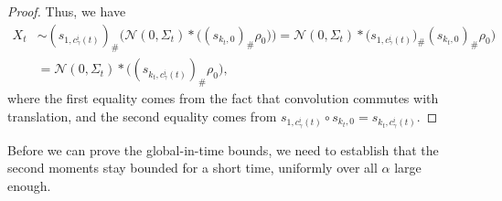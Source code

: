 \documentclass[reqno]{amsart}
\numberwithin{algorithm}{section}
\newcommand{\mc}[1]{\mathcal{#1}}
\begin{document}
{\begin{proof}
        Thus, we have
        \begin{equation}
            \begin{split}
                X_t &\sim (s_{1, c^i_\gamma(t)})_\# \Big(\mc{N}(0, \Sigma_t) \ast \big((s_{k_t,0})_\# \rho_0\big)\Big) = \mc{N}(0, \Sigma_t) \ast \Big (s_{1, c^i_\gamma(t)})_\# (s_{k_t,0})_\# \rho_0\Big) \\
                &= \mc{N}(0, \Sigma_t) \ast \Big((s_{k_t, c^i_\gamma(t)})_\# \rho_0\Big),
            \end{split}
        \end{equation}
        where the first equality comes from the fact that convolution commutes with translation, and the second equality comes from $s_{1, c^i_\gamma(t)} \circ s_{k_t,0} = s_{k_t, c^i_\gamma(t)}$.
    \end{proof}
    Before we can prove the global-in-time bounds, we need to establish that the second moments stay bounded for a short time, uniformly over all $\alpha$ large enough.
    
}
\end{document}
